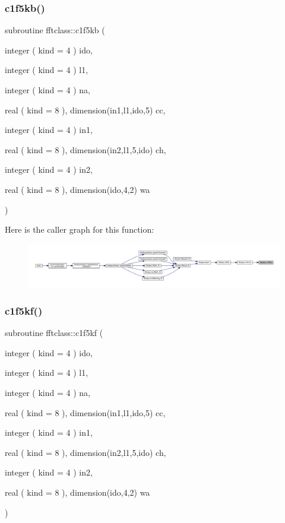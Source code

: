 \subsubsection{\texorpdfstring{c1f5kb()}{c1f5kb()}}
{\footnotesize\ttfamily subroutine fftclass\+::c1f5kb (\begin{DoxyParamCaption}\item[{integer ( kind = 4 )}]{ido,  }\item[{integer ( kind = 4 )}]{l1,  }\item[{integer ( kind = 4 )}]{na,  }\item[{real ( kind = 8 ), dimension(in1,l1,ido,5)}]{cc,  }\item[{integer ( kind = 4 )}]{in1,  }\item[{real ( kind = 8 ), dimension(in2,l1,5,ido)}]{ch,  }\item[{integer ( kind = 4 )}]{in2,  }\item[{real ( kind = 8 ), dimension(ido,4,2)}]{wa }\end{DoxyParamCaption})}

Here is the caller graph for this function\+:\nopagebreak
\begin{figure}[H]
\begin{center}
\leavevmode
\includegraphics[width=350pt]{namespacefftclass_aa356856107611ad66966fed70ede74f1_icgraph}
\end{center}
\end{figure}
\mbox{\label{namespacefftclass_a21d2647f4c2392ed5498288f99a3203c}} 
\subsubsection{\texorpdfstring{c1f5kf()}{c1f5kf()}}
{\footnotesize\ttfamily subroutine fftclass\+::c1f5kf (\begin{DoxyParamCaption}\item[{integer ( kind = 4 )}]{ido,  }\item[{integer ( kind = 4 )}]{l1,  }\item[{integer ( kind = 4 )}]{na,  }\item[{real ( kind = 8 ), dimension(in1,l1,ido,5)}]{cc,  }\item[{integer ( kind = 4 )}]{in1,  }\item[{real ( kind = 8 ), dimension(in2,l1,5,ido)}]{ch,  }\item[{integer ( kind = 4 )}]{in2,  }\item[{real ( kind = 8 ), dimension(ido,4,2)}]{wa }\end{DoxyParamCaption})}


